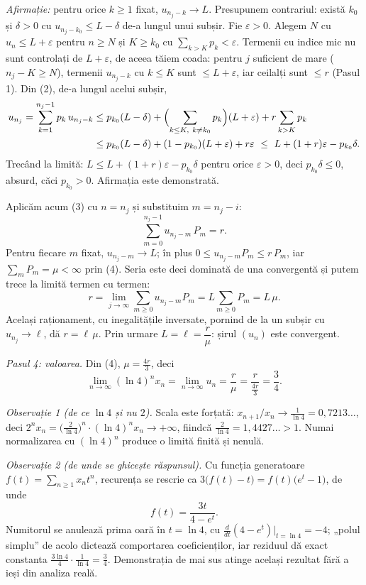 \emph{Afirmație:} pentru orice $k\ge1$ fixat, $u_{n_j-k}\to L$.
Presupunem contrariul: există $k_0$ și $\delta>0$ cu $u_{n_j-k_0}\le L-\delta$ de-a lungul unui subșir. Fie $\varepsilon>0$. Alegem $N$ cu $u_n\le L+\varepsilon$ pentru $n\ge N$ și $K\ge k_0$ cu $\sum_{k>K}p_k<\varepsilon$. Termenii cu indice mic nu sunt controlați de $L+\varepsilon$, de aceea tăiem coada: pentru $j$ suficient de mare ($n_j-K\ge N$), termenii $u_{n_j-k}$ cu $k\le K$ sunt $\le L+\varepsilon$, iar ceilalți sunt $\le r$ (Pasul 1). Din (2), de-a lungul acelui subșir,
\[ \begin{aligned} u_{n_j}=\sum_{k=1}^{n_j-1}p_k\,u_{n_j-k}&\le p_{k_0}(L-\delta)+\Bigl(\sum_{k\le K,\ k\neq k_0}p_k\Bigr)(L+\varepsilon)+r\sum_{k>K}p_k\\ &\le p_{k_0}(L-\delta)+(1-p_{k_0})(L+\varepsilon)+r\varepsilon\ \le\ L+(1+r)\varepsilon-p_{k_0}\delta . \end{aligned} \]
Trecând la limită: $L\le L+(1+r)\varepsilon-p_{k_0}\delta$ pentru orice $\varepsilon>0$, deci $p_{k_0}\delta\le0$, absurd, căci $p_{k_0}>0$. Afirmația este demonstrată.

Aplicăm acum (3) cu $n=n_j$ și substituim $m=n_j-i$:
\[ \sum_{m=0}^{n_j-1}u_{n_j-m}\,P_m=r . \]
Pentru fiecare $m$ fixat, $u_{n_j-m}\to L$; în plus $0\le u_{n_j-m}P_m\le r\,P_m$, iar $\sum_m P_m=\mu<\infty$ prin (4). Seria este deci dominată de una convergentă și putem trece la limită termen cu termen:
\[ r=\lim_{j\to\infty}\sum_{m\ge0}u_{n_j-m}P_m=L\sum_{m\ge0}P_m=L\,\mu . \]
Același raționament, cu inegalitățile inversate, pornind de la un subșir cu $u_{n_j}\to\ell$, dă $r=\ell\,\mu$. Prin urmare $L=\ell=\dfrac{r}{\mu}$: șirul $(u_n)$ este convergent.

\emph{Pasul 4: valoarea.} Din (4), $\mu=\frac{4r}{3}$, deci
\[ \lim_{n\to\infty}(\ln4)^n x_n=\lim_{n\to\infty}u_n=\frac{r}{\mu}=\frac{r}{\tfrac{4r}{3}}=\frac34 . \]

\emph{Observație 1 (de ce $\ln4$ și nu $2$).} Scala este forțată: $x_{n+1}/x_n\to\frac1{\ln4}=0{,}7213\dots$, deci $2^n x_n=\bigl(\tfrac{2}{\ln4}\bigr)^n\cdot(\ln4)^nx_n\to+\infty$, fiindcă $\frac{2}{\ln4}=1{,}4427\dots>1$. Numai normalizarea cu $(\ln 4)^n$ produce o limită finită și nenulă.

\emph{Observație 2 (de unde se ghicește răspunsul).} Cu funcția generatoare $f(t)=\sum_{n\ge1}x_nt^n$, recurența se rescrie ca $3\bigl(f(t)-t\bigr)=f(t)\bigl(e^{t}-1\bigr)$, de unde
\[ f(t)=\frac{3t}{4-e^{t}} . \]
Numitorul se anulează prima oară în $t=\ln4$, cu $\frac{d}{dt}(4-e^t)\big|_{t=\ln4}=-4$; „polul simplu'' de acolo dictează comportarea coeficienților, iar reziduul dă exact constanta $\frac{3\ln 4}{4}\cdot\frac1{\ln 4}=\frac34$. Demonstrația de mai sus atinge același rezultat fără a ieși din analiza reală.

